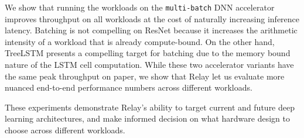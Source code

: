 We show that running the workloads
  on the \texttt{multi-batch} DNN accelerator improves throughput on all workloads at the cost
  of naturally increasing inference latency.
%
Batching is not compelling on ResNet because it increases the arithmetic
  intensity of a workload that is already compute-bound.
%
On the other hand, TreeLSTM presents a compelling target for batching due to the
  memory bound nature of the LSTM cell computation.
%
While these two accelerator variants have the same peak throughput on paper, we show that Relay let us
  evaluate more nuanced end-to-end performance numbers across different workloads.


These experiments demonstrate Relay's ability to target current and future deep learning architectures,
and make informed decision on what hardware design to choose across different workloads.



